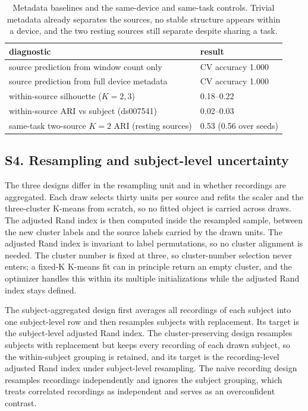 \begin{table}[H]
\centering
\small
\caption{Metadata baselines and the same-device and same-task controls. Trivial metadata already separates the sources, no stable structure appears within a device, and the two resting sources still separate despite sharing a task.}
\label{tab:metactrl}
\begin{tabular}{ll}
\hline
diagnostic & result\\
\hline
source prediction from window count only & CV accuracy 1.000\\
source prediction from full device metadata & CV accuracy 1.000\\
within-source silhouette ($K=2,3$) & 0.18--0.22\\
within-source ARI vs subject (ds007541) & 0.02--0.03\\
same-task two-source $K=2$ ARI (resting sources) & 0.53 (0.56 over seeds)\\
\hline
\end{tabular}

\end{table}

\subsection{S4. Resampling and subject-level
uncertainty}\label{s4.-resampling-and-subject-level-uncertainty}

The three designs differ in the resampling unit and in whether
recordings are aggregated. Each draw selects thirty units per source and
refits the scaler and the three-cluster K-means from scratch, so no
fitted object is carried across draws. The adjusted Rand index is then
computed inside the resampled sample, between the new cluster labels and
the source labels carried by the drawn units. The adjusted Rand index is
invariant to label permutations, so no cluster alignment is needed. The
cluster number is fixed at three, so cluster-number selection never
enters; a fixed-K K-means fit can in principle return an empty cluster,
and the optimizer handles this within its multiple initializations while
the adjusted Rand index stays defined.

The subject-aggregated design first averages all recordings of each
subject into one subject-level row and then resamples subjects with
replacement. Its target is the subject-level adjusted Rand index. The
cluster-preserving design resamples subjects with replacement but keeps
every recording of each drawn subject, so the within-subject grouping is
retained, and its target is the recording-level adjusted Rand index
under subject-level resampling. The naive recording design resamples
recordings independently and ignores the subject grouping, which treats
correlated recordings as independent and serves as an overconfident
contrast.

